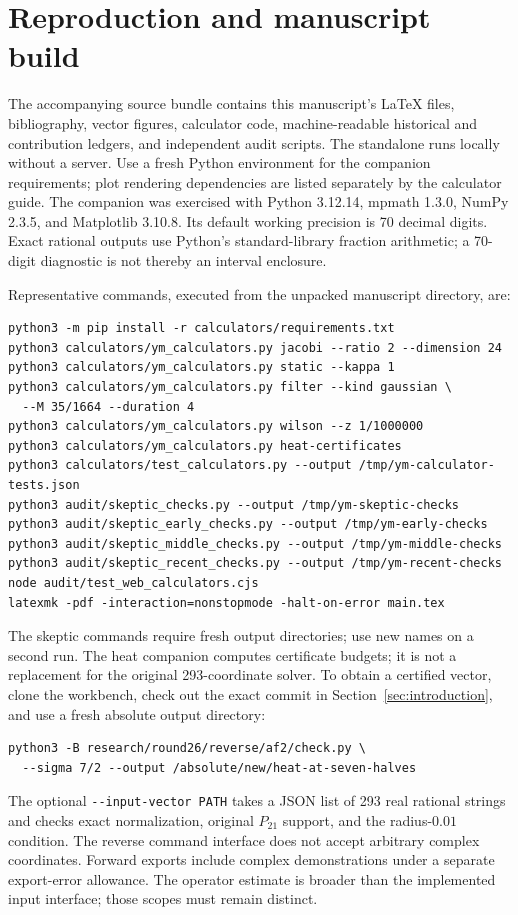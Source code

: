 \section{Reproduction and manuscript build}
\label{app:reproduction}

The accompanying source bundle contains this manuscript's \LaTeX{} files, bibliography, vector figures, calculator code, machine-readable historical and contribution ledgers, and independent audit scripts. The standalone  runs locally without a server. Use a fresh Python environment for the companion requirements; plot rendering dependencies are listed separately by the calculator guide.
The companion was exercised with Python 3.12.14, mpmath 1.3.0, NumPy 2.3.5, and Matplotlib 3.10.8. Its default working precision is 70 decimal digits. Exact rational outputs use Python's standard-library fraction arithmetic; a 70-digit diagnostic is not thereby an interval enclosure.

Representative commands, executed from the unpacked manuscript directory, are:
\begin{verbatim}
python3 -m pip install -r calculators/requirements.txt
python3 calculators/ym_calculators.py jacobi --ratio 2 --dimension 24
python3 calculators/ym_calculators.py static --kappa 1
python3 calculators/ym_calculators.py filter --kind gaussian \
  --M 35/1664 --duration 4
python3 calculators/ym_calculators.py wilson --z 1/1000000
python3 calculators/ym_calculators.py heat-certificates
python3 calculators/test_calculators.py --output /tmp/ym-calculator-tests.json
python3 audit/skeptic_checks.py --output /tmp/ym-skeptic-checks
python3 audit/skeptic_early_checks.py --output /tmp/ym-early-checks
python3 audit/skeptic_middle_checks.py --output /tmp/ym-middle-checks
python3 audit/skeptic_recent_checks.py --output /tmp/ym-recent-checks
node audit/test_web_calculators.cjs
latexmk -pdf -interaction=nonstopmode -halt-on-error main.tex
\end{verbatim}

The skeptic commands require fresh output directories; use new names on a second run. The heat companion computes certificate budgets; it is not a replacement for the original 293-coordinate solver. To obtain a certified vector, clone the workbench, check out the exact commit in Section~\ref{sec:introduction}, and use a fresh absolute output directory:
\begin{verbatim}
python3 -B research/round26/reverse/af2/check.py \
  --sigma 7/2 --output /absolute/new/heat-at-seven-halves
\end{verbatim}
The optional \verb|--input-vector PATH| takes a JSON list of 293 real rational strings and checks exact normalization, original $P_{21}$ support, and the radius-$0.01$ condition. The reverse command interface does not accept arbitrary complex coordinates. Forward exports include complex demonstrations under a separate export-error allowance. The operator estimate is broader than the implemented input interface; those scopes must remain distinct.

